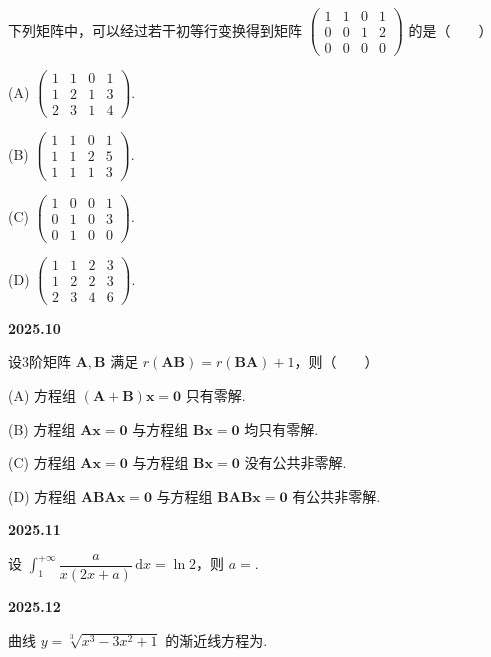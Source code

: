 \documentclass[UTF8,12pt,fontset=windows]{ctexart}
\begin{document}
下列矩阵中，可以经过若干初等行变换得到矩阵 $\begin{pmatrix}1&1&0&1\\0&0&1&2\\0&0&0&0\end{pmatrix}$ 的是（　　）

(A) $\begin{pmatrix}1&1&0&1\\1&2&1&3\\2&3&1&4\end{pmatrix}$.

(B) $\begin{pmatrix}1&1&0&1\\1&1&2&5\\1&1&1&3\end{pmatrix}$.

(C) $\begin{pmatrix}1&0&0&1\\0&1&0&3\\0&1&0&0\end{pmatrix}$.

(D) $\begin{pmatrix}1&1&2&3\\1&2&2&3\\2&3&4&6\end{pmatrix}$.

\vfill
\newpage
{\large\bfseries 2025.10}

设3阶矩阵 $\boldsymbol{A},\boldsymbol{B}$ 满足 $r(\boldsymbol{AB})=r(\boldsymbol{BA})+1$，则（　　）

(A) 方程组 $(\boldsymbol{A}+\boldsymbol{B})\boldsymbol{x}=\boldsymbol{0}$ 只有零解.

(B) 方程组 $\boldsymbol{Ax}=\boldsymbol{0}$ 与方程组 $\boldsymbol{Bx}=\boldsymbol{0}$ 均只有零解.

(C) 方程组 $\boldsymbol{Ax}=\boldsymbol{0}$ 与方程组 $\boldsymbol{Bx}=\boldsymbol{0}$ 没有公共非零解.

(D) 方程组 $\boldsymbol{ABAx}=\boldsymbol{0}$ 与方程组 $\boldsymbol{BABx}=\boldsymbol{0}$ 有公共非零解.

\vfill
\newpage
{\large\bfseries 2025.11}

设 $\int_1^{+\infty}\dfrac{a}{x(2x+a)}\,\mathrm{d}x=\ln2$，则 $a=$\underline{\hspace{20mm}}.

\vfill
\newpage
{\large\bfseries 2025.12}

曲线 $y=\sqrt[3]{x^3-3x^2+1}$ 的渐近线方程为\underline{\hspace{20mm}}.
\end{document}
